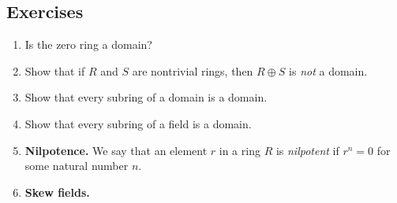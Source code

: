 \documentclass{article}
\begin{document}
\subsection*{Exercises}

\begin{enumerate}
\item Is the zero ring a domain?

\item Show that if $R$ and $S$ are nontrivial rings, then $R \oplus S$ is \emph{not} a domain.

\item Show that every subring of a domain is a domain.

\item Show that every subring of a field is a domain.

\item \textbf{Nilpotence.} We say that an element $r$ in a ring $R$ is \emph{nilpotent} if $r^n = 0$ for some natural number $n$.

\item \textbf{Skew fields.}
\end{enumerate}
\end{document}
